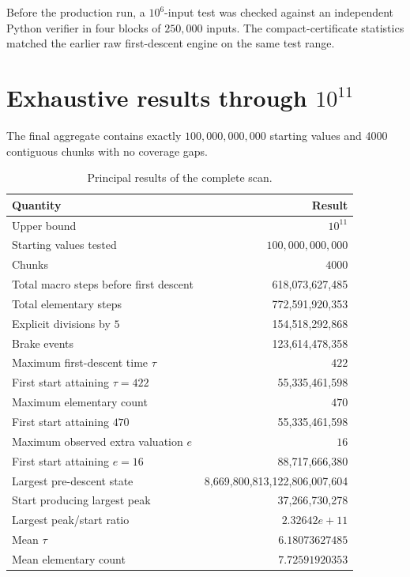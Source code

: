 \documentclass[11pt]{article}
\theoremstyle{definition}
\newcommand{\Nscan}{100{,}000{,}000{,}000}
\begin{document}
Before the production run, a $10^6$-input test was checked against an independent Python verifier in four blocks of $250{,}000$ inputs. The compact-certificate statistics matched the earlier raw first-descent engine on the same test range.

\section{Exhaustive results through $10^{11}$}

The final aggregate contains exactly $\Nscan$ starting values and 4000 contiguous chunks with no coverage gaps.

\begin{table}[H]
\centering
\caption{Principal results of the complete scan.}
\begin{tabular}{lr}
\toprule
Quantity & Result\\
\midrule
Upper bound & $10^{11}$\\
Starting values tested & $\Nscan$\\
Chunks & $4000$\\
Total macro steps before first descent & 618{,}073{,}627{,}485\\
Total elementary steps & 772{,}591{,}920{,}353\\
Explicit divisions by $5$ & 154{,}518{,}292{,}868\\
Brake events & 123{,}614{,}478{,}358\\
Maximum first-descent time $\tau$ & $422$\\
First start attaining $\tau=422$ & 55{,}335{,}461{,}598\\
Maximum elementary count & $470$\\
First start attaining $470$ & 55{,}335{,}461{,}598\\
Maximum observed extra valuation $e$ & $16$\\
First start attaining $e=16$ & 88{,}717{,}666{,}380\\
Largest pre-descent state & 8{,}669{,}800{,}813{,}122{,}806{,}007{,}604\\
Start producing largest peak & 37{,}266{,}730{,}278\\
Largest peak/start ratio & $2.32642e+11$\\
Mean $\tau$ & $6.18073627485$\\
Mean elementary count & $7.72591920353$\\
\bottomrule
\end{tabular}
\end{table}
\end{document}
